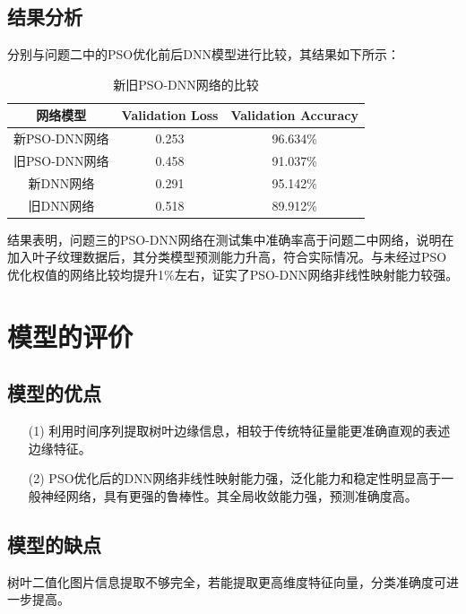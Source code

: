\documentclass{whutmod}
\begin{document}
    \subsection{结果分析}
	分别与问题二中的PSO优化前后DNN模型进行比较，其结果如下所示：
	\begin{table}[H]
		\centering	\caption{新旧PSO-DNN网络的比较}\label{hengs}
		\begin{tabular}{ccc}
			\toprule[2pt]
						\multicolumn{1}{m{3cm}}{\centering 网络模型}
						&
			\multicolumn{1}{m{3cm}}{\centering Validation Loss}
			& \multicolumn{1}{m{4cm}}{\centering Validation Accuracy}


			\\
			\midrule[1pt]
			新PSO-DNN网络	 &  0.253 &96.634\%  \\ 
			旧PSO-DNN网络	 &  0.458 &91.037\%  \\ 
			新DNN网络	 &  0.291 &95.142\%  \\ 
			旧DNN网络	 &  0.518 &89.912\%  \\ 
			\bottomrule[2pt]	
		\end{tabular}
		
	\end{table}

	结果表明，问题三的PSO-DNN网络在测试集中准确率高于问题二中网络，说明在加入叶子纹理数据后，其分类模型预测能力升高，符合实际情况。与未经过PSO优化权值的网络比较均提升1\%左右，证实了PSO-DNN网络非线性映射能力较强。
	
	\section{模型的评价}
	\subsection{模型的优点}
		\begin{itemize}                                             
		\item [(1)] 利用时间序列提取树叶边缘信息，相较于传统特征量能更准确直观的表述边缘特征。
		\item [(2)] PSO优化后的DNN网络非线性映射能力强，泛化能力和稳定性明显高于一般神经网络，具有更强的鲁棒性。其全局收敛能力强，预测准确度高。
	
	\end{itemize}
	\subsection{模型的缺点}
	树叶二值化图片信息提取不够完全，若能提取更高维度特征向量，分类准确度可进一步提高。
\end{document}
